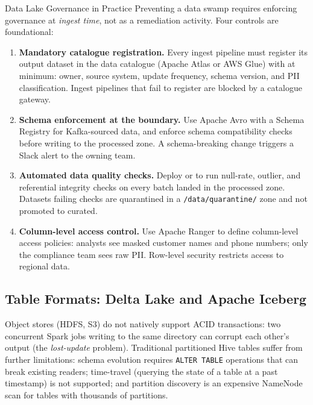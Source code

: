 \begin{systemdesign}{Data Lake Governance in Practice}
Preventing a data swamp requires enforcing governance at \emph{ingest
time}, not as a remediation activity. Four controls are foundational:
\begin{enumerate}
  \item \textbf{Mandatory catalogue registration.} Every ingest pipeline
        must register its output dataset in the data catalogue (Apache
        Atlas or AWS Glue) with at minimum: owner, source system,
        update frequency, schema version, and PII classification.
        Ingest pipelines that fail to register are blocked by a catalogue
        gateway.
  \item \textbf{Schema enforcement at the boundary.} Use Apache Avro with
        a Schema Registry for Kafka-sourced data, and enforce schema
        compatibility checks before writing to the processed zone. A
        schema-breaking change triggers a Slack alert to the owning team.
  \item \textbf{Automated data quality checks.} Deploy  or  to run null-rate, outlier,
        and referential integrity checks on every batch landed in the
        processed zone. Datasets failing checks are quarantined in a
        \texttt{/data/quarantine/} zone and not promoted to curated.
  \item \textbf{Column-level access control.} Use Apache Ranger to define
        column-level access policies: analysts see masked customer names
        and phone numbers; only the compliance team sees raw PII.
        Row-level security restricts access to regional data.
\end{enumerate}
\end{systemdesign}

\subsection{Table Formats: Delta Lake and Apache Iceberg}
\label{subsec:table-formats}

Object stores (HDFS, S3) do not natively support ACID transactions:
two concurrent Spark jobs writing to the same directory can corrupt
each other's output (the \emph{lost-update} problem). Traditional
partitioned Hive tables suffer from further limitations: schema
evolution requires \texttt{ALTER TABLE} operations that can break
existing readers; time-travel (querying the state of a table at a
past timestamp) is not supported; and partition discovery is an
expensive NameNode scan for tables with thousands of partitions.

